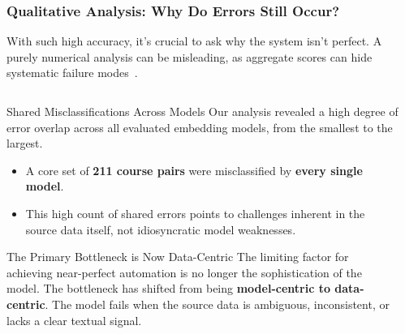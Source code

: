 \documentclass[aspectratio=169,10pt]{beamer}
\begin{document}
\begin{frame}
    \frametitle{Qualitative Analysis: Why Do Errors Still Occur?}
    
    With such high accuracy, it's crucial to ask why the system isn't perfect. A purely numerical analysis can be misleading, as aggregate scores can hide systematic failure modes~\cite{gauthier2022}.

    \fontsize{9}{9}\selectfont
    \begin{columns}[T]
        \begin{column}{0.5\textwidth}
            \begin{block}{Shared Misclassifications Across Models}
                Our analysis revealed a high degree of error overlap across all evaluated embedding models, from the smallest to the largest.
                \begin{itemize}
                    \item A core set of \textbf{211 course pairs} were misclassified by \textbf{every single model}.
                    \item This high count of shared errors points to challenges inherent in the source data itself, not idiosyncratic model weaknesses.
                \end{itemize}
            \end{block}
            
            \begin{alertblock}{The Primary Bottleneck is Now Data-Centric}
                The limiting factor for achieving near-perfect automation is no longer the sophistication of the model. The bottleneck has shifted from being \textbf{model-centric to data-centric}. The model fails when the source data is ambiguous, inconsistent, or lacks a clear textual signal.
            \end{alertblock}
        \end{column}
        
        \begin{column}{0.45\textwidth}
            

\end{column}
\end{columns}
\end{frame}
\end{document}
